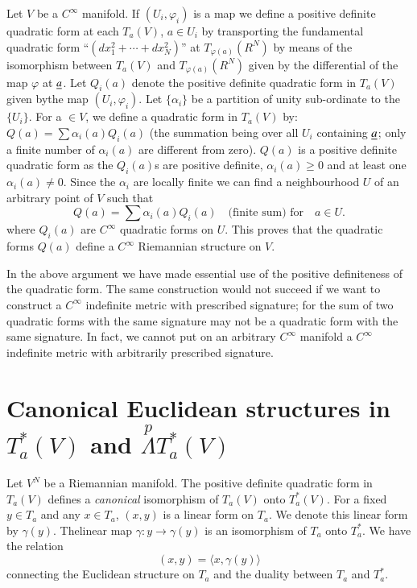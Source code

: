 Let $V$ be a $C^{\infty}$ manifold. If $(U_{i},\varphi_{i})$ is a map
we define a positive definite quadratic form at each $T_{a}(V)$, $a\in
U_{i}$ by transporting the fundamental quadratic form
``$(dx^{2}_{1}+\cdots+dx^{2}_{N})$'' at $T_{\varphi(a)}(R^{N})$ by
means of the isomorphism between $T_{a}(V)$ and
$T_{\varphi(a)}(R^{N})$ given by the differential of the map $\varphi$
at $\underline{a}$. Let $Q_{i}(a)$ denote the positive definite quadratic
form in $T_{a}(V)$ given  by\pageoriginale the map
$(U_{i},\varphi_{i})$. Let $\{\alpha_{i}\}$ be a partition of unity
sub-ordinate to the $\{U_{i}\}$. For a $\in V$, we define a quadratic
form in $T_{a}(V)$ by: $Q(a)=\sum\alpha_{i}(a)Q_{i}(a)$ (the summation
being over all $U_{i}$ containing $\underline{a}$; only a finite number of
$\alpha_{i}(a)$ are different from zero). $Q(a)$ is a positive
definite quadratic form as the $Q_{i}(a)$s are positive definite,
$\alpha_{i}(a)\geq 0$ and at least one $\alpha_{i}(a)\neq 0$. Since
the $\alpha_{i}$ are locally finite we can find a neighbourhood $U$ of
an arbitrary point of $V$ such that
$$
Q(a)=\sum\alpha_{i}(a)Q_{i}(a)\quad\text{(finite sum) for}\quad a\in U.
$$
where $Q_{i}(a)$ are $C^{\infty}$ quadratic forms on $U$. This proves
that the quadratic forms $Q(a)$ define a $C^{\infty}$ Riemannian
structure on $V$.

In the above argument we have made essential use of the positive
definiteness of the quadratic form. The same construction would not
succeed if we want to construct a $C^{\infty}$ indefinite metric with
prescribed signature; for the sum of two quadratic forms with the same
signature may not be a quadratic form with the same signature. In
fact, we cannot put on an arbitrary $C^{\infty}$ manifold a
$C^{\infty}$ indefinite metric with arbitrarily prescribed signature.

\section*{Canonical Euclidean structures in\protect\hfil\protect\break $T^{\ast}_{a}(V)$ and
  $\overset{p}{\Lambda} T^{\ast}_{a}(V)$} 

Let $V^{N}$ be a Riemannian manifold. The positive definite quadratic
form in $T_{a}(V)$ defines a {\em canonical} isomorphism of $T_{a}(V)$
onto $T^{\ast}_{a}(V)$. For a fixed $y\in T_{a}$ and any $x\in T_{a}$,
$(x,y)$ is a linear form on $T_{a}$. We denote this linear form by
$\gamma(y)$. The\pageoriginale linear map $\gamma:y\to \gamma(y)$ is
an isomorphism of $T_{a}$ onto $T^{\ast}_{a}$. We have the relation
$$
(x,y)=\langle x,\gamma(y)\rangle
$$
connecting the Euclidean structure on $T_{a}$ and the duality between
$T_{a}$ and $T^{\ast}_{a}$.

